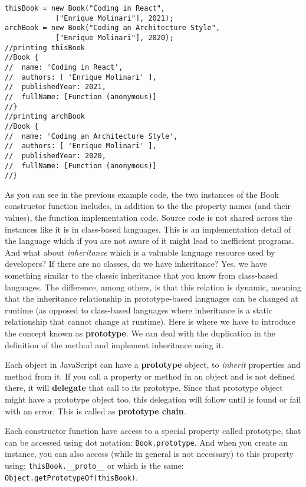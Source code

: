 \documentclass[a4paper, oneside, titlepage, 12pt]{book}
\begin{document}
\begin{verbatim}
thisBook = new Book("Coding in React", 
			["Enrique Molinari"], 2021);
archBook = new Book("Coding an Architecture Style", 
			["Enrique Molinari"], 2020);
//printing thisBook
//Book {
//  name: 'Coding in React',
//  authors: [ 'Enrique Molinari' ],
//  publishedYear: 2021,
//  fullName: [Function (anonymous)]
//}
//printing archBook
//Book {
//  name: 'Coding an Architecture Style',
//  authors: [ 'Enrique Molinari' ],
//  publishedYear: 2020,
//  fullName: [Function (anonymous)]
//}
\end{verbatim}

As you can see in the previous example code, the two instances of the Book constructor function includes, in addition to the the property names (and their values), the function implementation code. Source code is not shared across the instances like it is in class-based languages. This is an implementation detail of the language which if you are not aware of it might lead to inefficient programs. And what about \textit{inheritance} which is a valuable language resource used by developers? If there are no classes, do we have inheritance? Yes, we have something similar to the classic inheritance that you know from class-based languages. The difference, among others, is that this relation is dynamic, meaning that the inheritance relationship in prototype-based languages can be changed at runtime (as opposed to class-based languages where inheritance is a static relationship that cannot change at runtime). Here is where we have to introduce the concept known as \textbf{prototype}. We can deal with the duplication in the definition of the method and implement inheritance using it. 
\newline

Each object in JavaScript can have a \textbf{prototype} object, to \textit{inherit} properties and method from it. If you call a property or method in an object and is not defined there, it will \textbf{delegate} that call to its prototype. Since that prototype object might have a prototype object too, this delegation will follow until is found or fail with an error. This is called as \textbf{prototype chain}. 
\newline

Each constructor function have access to a special property called prototype, that can be accessed using dot notation: \texttt{Book.prototype}. And when you create an instance, you can also access (while in general is not necessary) to this property using: \texttt{thisBook.__proto__} or which is the same:\\ \texttt{Object.getPrototypeOf(thisBook)}.
\end{document}
